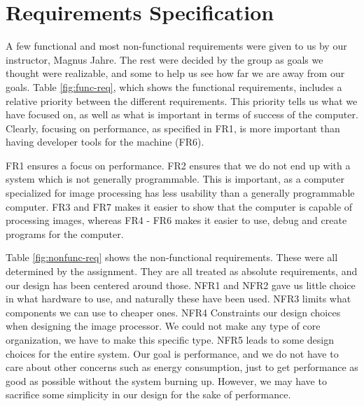 \section{Requirements Specification}

 A few functional
and most non-functional requirements were given to us by our instructor, Magnus
Jahre. The rest were decided by the group as goals we thought were realizable, and
some to help us see how far we are away from our goals. Table
\ref{fig:func-req}, which shows the functional requirements, includes a relative
priority between the different requirements.  This priority tells us what we
have focused on, as well as what is important in terms of success of the
computer. Clearly, focusing on performance, as specified in {\sc FR1}, is more
important than having developer tools for the machine ({\sc FR6}).

{\sc FR1} ensures a focus on performance. {\sc FR2} ensures that we do not end
up with a system which is not generally programmable. This is important, as a
computer specialized for image processing has less usability than a generally
programmable computer. {\sc FR3} and {\sc FR7} makes it easier to show that the
computer is capable of processing images, whereas {\sc FR4 - FR6} makes it
easier to use, debug and create programs for the computer.



Table \ref{fig:nonfunc-req} shows the non-functional requirements. These were
all determined by the assignment. They are all treated as absolute requirements,
and our design has been centered around those. {\sc NFR1} and {\sc NFR2} gave us
little choice in what hardware to use, and naturally these have been used. {\sc
  NFR3} limits what components we can use to cheaper ones. {\sc NFR4} Constraints our
design choices when designing the image processor. We could not make any type of core
organization, we have to make this specific type. {\sc NFR5} leads to some
design choices for the entire system. Our goal is performance, and we do not
have to care about other concerns such as energy consumption, just to
get performance as good as possible without the system
burning up. However, we may have to sacrifice some simplicity in our design for
the sake of performance.
